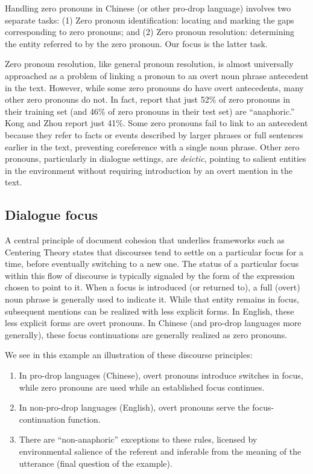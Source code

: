 \documentclass[11pt]{report}
\begin{document}
Handling zero pronouns in Chinese (or other pro-drop language) involves two separate tasks: (1) Zero pronoun identification: locating and marking the gaps corresponding to zero pronouns; and (2) Zero pronoun resolution: determining the entity referred to by the zero pronoun. Our focus is the latter task.

Zero pronoun resolution, like general pronoun resolution, is almost universally approached as a problem of linking a pronoun to an overt noun phrase antecedent in the text. However, while some zero pronouns do have overt antecedents, many other zero pronouns do not. In fact, \cite{zhao2007identification} report that just 52\% of zero pronouns in their training set (and 46\% of zero pronouns in their test set) are ``anaphoric.'' Kong and Zhou \cite{kong2010tree} report just 41\%. Some zero pronouns fail to link to an antecedent because they refer to facts or events described by larger phrases or full sentences earlier in the text, preventing coreference with a single noun phrase. Other zero pronouns, particularly in dialogue settings, are \emph{deictic}, pointing to salient entities in the environment without requiring introduction by an overt mention in the text.%

\subsection{Dialogue focus}

A central principle of document cohesion that underlies frameworks such as Centering Theory \cite{grosz1995centering} states that discourses tend to settle on a particular focus for a time, before eventually switching to a new one. The status of a particular focus within this flow of discourse is typically signaled by the form of the expression chosen to point to it. When a focus is introduced (or returned to), a full (overt) noun phrase is generally used to indicate it. While that entity remains in focus, subsequent mentions can be realized with less explicit forms. In English, these less explicit forms are overt pronouns. In Chinese (and pro-drop languages more generally), these focus continuations are generally realized as zero pronouns.

We see in this example an illustration of these discourse principles:
\begin{enumerate} \itemsep1pt \parskip0pt 
\item In pro-drop languages (Chinese), overt pronouns introduce switches in focus, while zero pronouns are used while an established focus continues.
\item In non-pro-drop languages (English), overt pronouns serve the focus-continuation function.
\item There are  ``non-anaphoric'' exceptions to these rules, licensed by environmental salience of the referent and inferable from the meaning of the utterance (final question of the example).
\end{enumerate}
\end{document}
